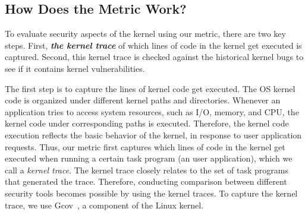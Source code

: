 \subsection{How Does the Metric Work?}
To evaluate security aspects of the kernel using our metric, there are two key steps. First, 
\textbf{\textit{the kernel trace}} of which lines of code in the kernel get executed is captured. 
Second, this kernel trace is checked against the historical kernel bugs to see if it contains kernel vulnerabilities. 

The first step is to capture the lines of kernel code get executed. 
The OS kernel code is organized under different kernel paths and directories. 
Whenever an application tries to access system resources, such as I/O, memory, and CPU, the kernel code 
under corresponding paths is executed. Therefore, the kernel code execution 
reflects the basic behavior of the kernel, in response to user application requests. 
Thus, %
our metric %
first captures which lines of code in the kernel get executed 
when running a certain task program (an user application), which we call a \textit{kernel trace}. The kernel trace closely
relates to the set of task programs that generated the trace. Therefore, conducting comparison between 
different security tools  
becomes possible by using the kernel traces. To capture the kernel trace, 
we use Gcov~\cite{gcov}, a component of the Linux kernel.

